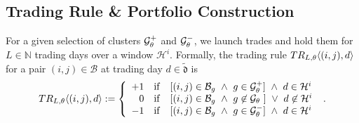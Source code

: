 \subsection{Trading Rule \& Portfolio Construction}
\hspace{0.5cm}For a given selection of clusters $\G_{\theta}^+$ and $\G_{\theta}^-$, we launch trades and hold them for $L\in\mathbb{N}$ trading days over a window $\mathcal H^i$.
Formally, the trading rule $TR_{{{L}},\theta}\angl{(i,j),d}$ for a pair $(i,j)\in\mathcal{B}$ at trading day ${d}\in\tilde{\mathfrak d}$ is 
\begin{align*}
TR_{{{L}},\theta}\angl{(i,j),{d}} := \mycases{rllllll}{
+1
&\IF 
&
[
(i,j)\in\mathcal{B}_g
~\wedge~
g \in \G_{\theta}^+
]
~\wedge~
{d}\in \mathcal H^i
\\
0
&\IF
&
[
(i,j)\in\mathcal{B}_g
~\wedge~
g \not\in \G_\theta ~
]
~\vee~
{d}
\not\in \mathcal H^i
\\
-1
&\IF 
&
[
(i,j)\in\mathcal{B}_g
~\wedge~
g \in \G_{\theta}^-
]
~\wedge~
{d}
\in \mathcal H^i
}
~.
\end{align*}


